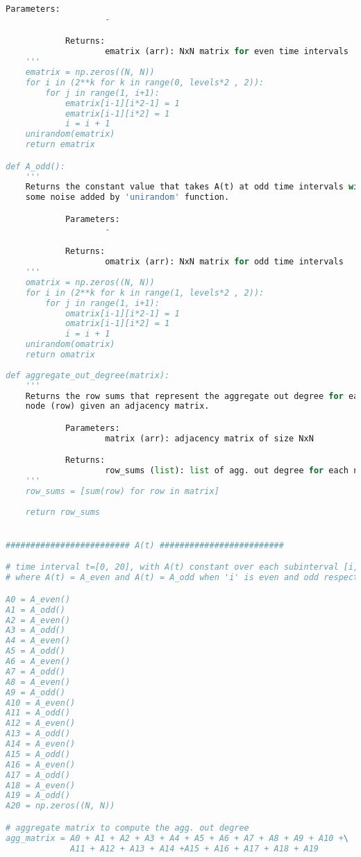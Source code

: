 \begin{lstlisting}[language=Python, caption=First synthetic experiment]
            Parameters:
                    -

            Returns:
                    ematrix (arr): NxN matrix for even time intervals
    '''
    ematrix = np.zeros((N, N))
    for i in (2**k for k in range(0, levels*2 , 2)):
        for j in range(1, i+1):
            ematrix[i-1][i*2-1] = 1
            ematrix[i-1][i*2] = 1
            i = i + 1
    unirandom(ematrix)
    return ematrix

def A_odd():
    '''
    Returns the constant value that takes A(t) at odd time intervals with 
    some noise added by 'unirandom' function.

            Parameters:
                    -

            Returns:
                    omatrix (arr): NxN matrix for odd time intervals
    '''
    omatrix = np.zeros((N, N))
    for i in (2**k for k in range(1, levels*2 , 2)):
        for j in range(1, i+1):
            omatrix[i-1][i*2-1] = 1
            omatrix[i-1][i*2] = 1
            i = i + 1
    unirandom(omatrix)
    return omatrix
   
def aggregate_out_degree(matrix):
    '''
    Returns the row sums that represent the aggregate out degree for each
    node (row) given an adjacency matrix.

            Parameters:
                    matrix (arr): adjacency matrix of size NxN

            Returns:
                    row_sums (list): list of agg. out degree for each node
    '''
    row_sums = [sum(row) for row in matrix]
    
    return row_sums


######################### A(t) #########################

# time interval t=[0, 20], with A(t) constant over each subinterval [i, i + 1)
# where A(t) = A_even and A(t) = A_odd when 'i' is even and odd respectively

A0 = A_even()
A1 = A_odd()
A2 = A_even()
A3 = A_odd()
A4 = A_even()
A5 = A_odd()
A6 = A_even()
A7 = A_odd()
A8 = A_even()
A9 = A_odd()
A10 = A_even()
A11 = A_odd()
A12 = A_even()
A13 = A_odd()
A14 = A_even()
A15 = A_odd()
A16 = A_even()
A17 = A_odd()
A18 = A_even()
A19 = A_odd()
A20 = np.zeros((N, N))

# aggregate matrix to compute the agg. out degree
agg_matrix = A0 + A1 + A2 + A3 + A4 + A5 + A6 + A7 + A8 + A9 + A10 +\
             A11 + A12 + A13 + A14 +A15 + A16 + A17 + A18 + A19
      


\end{lstlisting}
